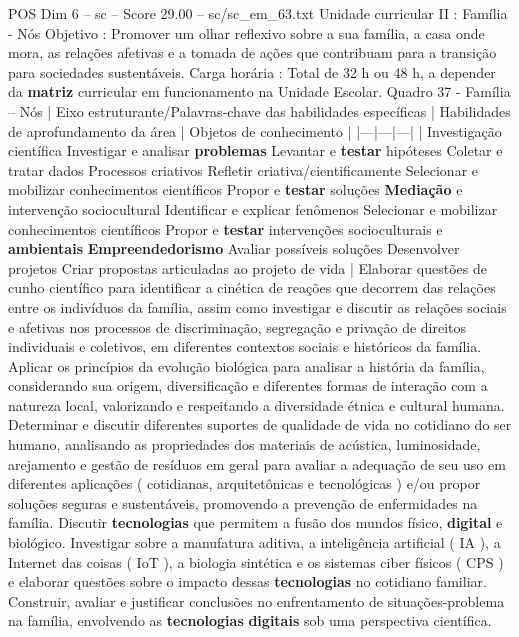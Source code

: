 \begin{textsample}{POS Dim 6 – sc – Score 29.00 – sc/sc\_em\_63.txt}
Unidade curricular II : Família - Nós Objetivo : Promover um olhar reflexivo sobre a sua família, a casa onde mora, as relações afetivas e a tomada de ações que contribuam para a transição para sociedades sustentáveis.
Carga horária : Total de 32 h ou 48 h, a depender da \textbf{matriz} curricular em funcionamento na Unidade Escolar.
Quadro 37 - Família – Nós | Eixo estruturante/Palavras-chave das habilidades específicas | Habilidades de aprofundamento da área | Objetos de conhecimento | |---|---|---| | Investigação científica Investigar e analisar \textbf{problemas} Levantar e \textbf{testar} hipóteses Coletar e tratar dados Processos criativos Refletir criativa/cientificamente Selecionar e mobilizar conhecimentos científicos Propor e \textbf{testar} soluções \textbf{Mediação} e intervenção sociocultural Identificar e explicar fenômenos Selecionar e mobilizar conhecimentos científicos Propor e \textbf{testar} intervenções socioculturais e \textbf{ambientais} \textbf{Empreendedorismo} Avaliar possíveis soluções Desenvolver projetos Criar propostas articuladas ao projeto de vida | Elaborar questões de cunho científico para identificar a cinética de reações que decorrem das relações entre os indivíduos da família, assim como investigar e discutir as relações sociais e afetivas nos processos de discriminação, segregação e privação de direitos individuais e coletivos, em diferentes contextos sociais e históricos da família.
Aplicar os princípios da evolução biológica para analisar a história da família, considerando sua origem, diversificação e diferentes formas de interação com a natureza local, valorizando e respeitando a diversidade étnica e cultural humana.
Determinar e discutir diferentes suportes de qualidade de vida no cotidiano do ser humano, analisando as propriedades dos materiais de acústica, luminosidade, arejamento e gestão de resíduos em geral para avaliar a adequação de seu uso em diferentes aplicações ( cotidianas, arquitetônicas e tecnológicas ) e/ou propor soluções seguras e sustentáveis, promovendo a prevenção de enfermidades na família.
Discutir \textbf{tecnologias} que permitem a fusão dos mundos físico, \textbf{digital} e biológico.
Investigar sobre a manufatura aditiva, a inteligência artificial ( IA ), a Internet das coisas ( IoT ), a biologia sintética e os sistemas ciber físicos ( CPS ) e elaborar questões sobre o impacto dessas \textbf{tecnologias} no cotidiano familiar.
Construir, avaliar e justificar conclusões no enfrentamento de situações-problema na família, envolvendo as \textbf{tecnologias} \textbf{digitais} sob uma perspectiva científica.

\end{textsample}

